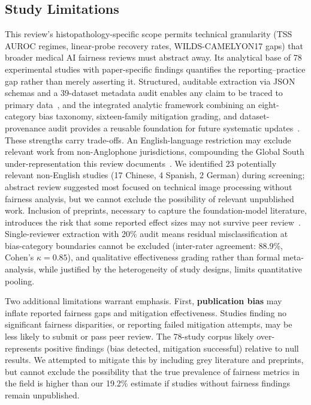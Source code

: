 \subsection{Study Limitations}
\label{sec:discussion:limitations}
This review's histopathology-specific scope permits technical granularity (TSS AUROC regimes, linear-probe recovery rates, WILDS-CAMELYON17 gaps) that broader medical AI fairness reviews must abstract away. Its analytical base of 78 experimental studies with paper-specific findings quantifies the reporting--practice gap rather than merely asserting it. Structured, auditable extraction via JSON schemas and a 39-dataset metadata audit enables any claim to be traced to primary data~\citep{sounderajah2021stardai}, and the integrated analytic framework combining an eight-category bias taxonomy, sixteen-family mitigation grading, and dataset-provenance audit provides a reusable foundation for future systematic updates~\citep{chen2023algorithmic, montezuma2025unbiased}. These strengths carry trade-offs. An English-language restriction may exclude relevant work from non-Anglophone jurisdictions, compounding the Global South under-representation this review documents~\citep{musa2026cross, celi2022sources}. We identified 23 potentially relevant non-English studies (17 Chinese, 4 Spanish, 2 German) during screening; abstract review suggested most focused on technical image processing without fairness analysis, but we cannot exclude the possibility of relevant unpublished work. Inclusion of preprints, necessary to capture the foundation-model literature, introduces the risk that some reported effect sizes may not survive peer review~\citep{komen2024batch, huang2025knowledge}. Single-reviewer extraction with 20\% audit means residual misclassification at bias-category boundaries cannot be excluded (inter-rater agreement: 88.9\%, Cohen's $\kappa=0.85$), and qualitative effectiveness grading rather than formal meta-analysis, while justified by the heterogeneity of study designs, limits quantitative pooling.

Two additional limitations warrant emphasis. First, \textbf{publication bias} may inflate reported fairness gaps and mitigation effectiveness. Studies finding no significant fairness disparities, or reporting failed mitigation attempts, may be less likely to submit or pass peer review. The 78-study corpus likely over-represents positive findings (bias detected, mitigation successful) relative to null results. We attempted to mitigate this by including grey literature and preprints, but cannot exclude the possibility that the true prevalence of fairness metrics in the field is higher than our 19.2\% estimate if studies without fairness findings remain unpublished.

